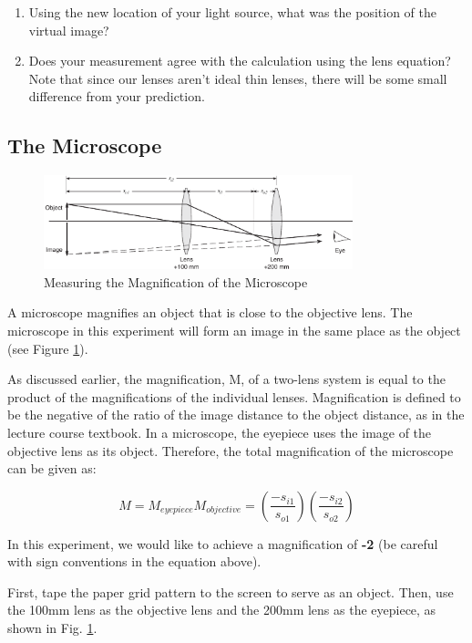 \begin{enumerate}
\item Using the new location of your light source, what was the position of the virtual image?

\item Does your measurement agree with the calculation using the lens equation? Note that since our lenses aren't ideal thin lenses, there will be some small  difference from your prediction.

\end{enumerate}

\subsection{The Microscope}
\myskip
\begin{figure}[h]
\centering
\includegraphics[width=0.8\textwidth]{./Exp7/pic/image9a.png}
\caption{Measuring the Magnification of the Microscope}
\label{fig:microscope}
\end{figure}

A microscope magnifies an object that is close to the objective lens. The microscope in this experiment will form an image in the same place as the object (see Figure \ref{fig:microscope}).\myskip

As discussed earlier, the magnification, M, of a two-lens system is equal to the product of the magnifications
of the individual lenses. Magnification is defined to be the negative of the ratio of the image distance to the object distance, as in the lecture course textbook. In a microscope, the eyepiece uses the image of the objective lens as its object. Therefore, the total magnification of the microscope can be given as:

\begin{equation}
\label{eq:magnification}
	M=M_{eyepiece}M_{objective} =  \left(\frac{-s_{i1}}{s_{o1}}\right) \left(\frac{-s_{i2}}{s_{o2}}\right)
\end{equation}

In this experiment, we would like to achieve a magnification of \textbf{-2} (be careful with sign conventions in the equation above).\myskip

First, tape the paper grid pattern to the screen to serve as an object. Then, use the 100mm lens as the objective lens and the 200mm lens as the eyepiece, as shown in Fig. \ref{fig:microscope}.

